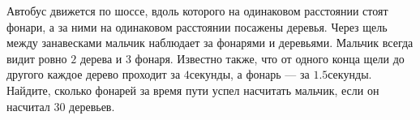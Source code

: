  Автобус движется по шоссе, вдоль которого на одинаковом расстоянии стоят фонари, а за ними на одинаковом расстоянии посажены деревья. Через щель между занавесками мальчик наблюдает за фонарями и деревьями. Мальчик всегда видит ровно $2$ дерева и $3$ фонаря. Известно также, что от одного конца щели до другого каждое дерево проходит за $4\unit{секунды}$, а фонарь --- за $1.5\unit{секунды}$. Найдите, сколько фонарей за время пути успел насчитать мальчик, если он насчитал $30$ деревьев. 